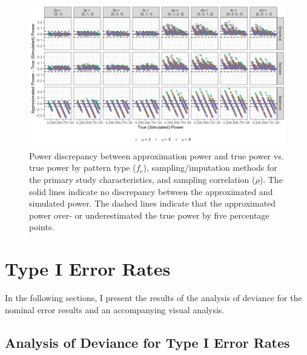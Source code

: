 \begin{figure}
    \centering
    \vspace{-5pt}\includegraphics[width=\linewidth]{chapters/plots/fc_rho_all_samp_rejrate.png}\caption{Power discrepancy between approximation power and true power vs. true power by pattern type ($f_c$), sampling/imputation methods for the primary study characteristics, and sampling correlation ($\rho$). The solid lines indicate no discrepancy between the approximated and simulated power. The dashed lines indicate that the approximated power over- or underestimated the true power by five percentage points. \label{fig: fc_rho_all_samp_rejrate}}
    \vspace{-5pt}
\end{figure}

\section{Type I Error Rates}

In the following sections, I present the results of the analysis of deviance for the nominal error results and an accompanying visual analysis.

\subsection{Analysis of Deviance for Type I Error Rates}

